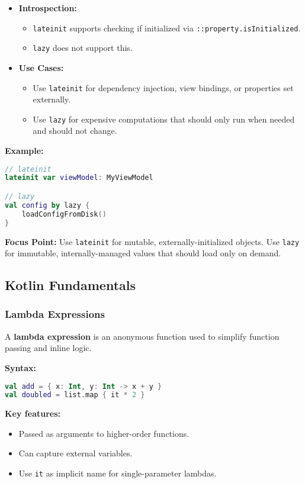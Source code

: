 \documentclass[a4paper,12pt]{article}
\begin{document}
\begin{itemize}
  \item \textbf{Introspection:}
    \begin{itemize}
      \item \texttt{lateinit} supports checking if initialized via \texttt{::property.isInitialized}.
      \item \texttt{lazy} does not support this.
    \end{itemize}

  \item \textbf{Use Cases:}
    \begin{itemize}
      \item Use \texttt{lateinit} for dependency injection, view bindings, or properties set externally.
      \item Use \texttt{lazy} for expensive computations that should only run when needed and should not change.
    \end{itemize}
\end{itemize}

\textbf{Example:}
\begin{lstlisting}[language=Kotlin]
// lateinit
lateinit var viewModel: MyViewModel

// lazy
val config by lazy {
    loadConfigFromDisk()
}
\end{lstlisting}

\textbf{Focus Point:} Use \texttt{lateinit} for mutable, externally-initialized objects. Use \texttt{lazy} for immutable, internally-managed values that should load only on demand.


\subsection{Kotlin Fundamentals}

\subsubsection{Lambda Expressions}

A \textbf{lambda expression} is an anonymous function used to simplify function passing and inline logic.

\textbf{Syntax:}
\begin{lstlisting}[language=Kotlin]
val add = { x: Int, y: Int -> x + y }
val doubled = list.map { it * 2 }
\end{lstlisting}

\textbf{Key features:}
\begin{itemize}
  \item Passed as arguments to higher-order functions.
  \item Can capture external variables.
  \item Use \texttt{it} as implicit name for single-parameter lambdas.
\end{itemize}
\end{document}
